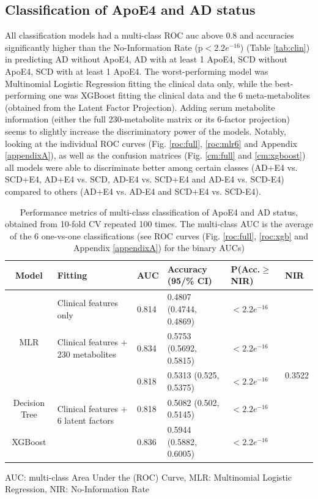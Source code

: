 \documentclass{amsart}
\begin{document}
\subsection{Classification of ApoE4 and AD status}
All classification models had a multi-class ROC \acrshort{auc} above 0.8 and accuracies significantly higher than the No-Information Rate (p$<2.2e^{-16}$) (Table \ref{tab:clin}) in predicting AD without ApoE4, AD with at least 1 ApoE4, SCD without ApoE4, SCD with at least 1 ApoE4. The worst-performing model was  Multinomial Logistic Regression fitting the clinical data only, while the best-performing one was XGBoost fitting the clinical data and the 6 meta-metabolites (obtained from the Latent Factor Projection). Adding serum metabolite information (either the full 230-metabolite matrix or its 6-factor projection) seems to slightly increase the discriminatory power of the models.
Notably, looking at the individual ROC curves (Fig. \ref{roc:full}, \ref{roc:mlr6} and Appendix \ref{appendixA}), as well as the confusion matrices (Fig. \ref{cm:full} and \ref{cm:xgboost}) all models were able to discriminate better among certain classes (AD+E4 vs. SCD+E4, AD+E4 vs. SCD, AD-E4 vs. SCD+E4 and AD-E4 vs. SCD-E4) compared to others (AD+E4 vs. AD-E4 and SCD+E4 vs. SCD-E4).
\begin{table}[H]
  \centering
\caption{Performance metrics of multi-class classification of ApoE4 and AD status, obtained from 10-fold CV repeated 100 times. The multi-class AUC is the average of the 6 one-vs-one classifications (see ROC curves (Fig. \ref{roc:full}, \ref{roc:xgb} and Appendix \ref{appendixA}) for the binary AUCs)} 
\label{tab:class_results}
\begin{threeparttable}
\begin{tabular}{clllll}\toprule
Model  & Fitting & AUC & Accuracy (95/\% CI) & P(Acc.$\geq$NIR) & NIR \\ \midrule
\multirow{3}{*}{MLR} & Clinical features only & 0.814 & 0.4807 (0.4744, 0.4869) & $<2.2e^{-16}$ & \multirow{5}{*}{0.3522} \\
& Clinical features + 230 metabolites & 0.834 & 0.5753 (0.5692, 0.5815) & $<2.2e^{-16}$ &  \\
& \multirow{3}{*}{Clinical features + 6 latent factors} & 0.818 & 0.5313 (0.525, 0.5375) & $<2.2e^{-16}$ &  \\
Decision Tree & & 0.818 & 0.5082 (0.502, 0.5145) & $<2.2e^{-16}$ &  \\
XGBoost & & 0.836 & 0.5944 (0.5882, 0.6005) & $<2.2e^{-16}$ &  \\ \bottomrule
\end{tabular}
\begin{tablenotes}
  \item[]  AUC: multi-class Area Under the (ROC) Curve, MLR: Multinomial Logistic Regression, NIR: No-Information Rate
\end{tablenotes}
\end{threeparttable}
\end{table}
\end{document}
